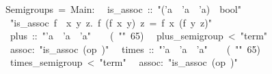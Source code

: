 \begin{isabelle}%
~Semigroups~=~Main:\isanewline
\isanewline
{}\isanewline
~~is\_assoc~::~{"}('a~{\isasymRightarrow}~'a~{\isasymRightarrow}~'a)~{\isasymRightarrow}~bool{"}\isanewline
~~{"}is\_assoc~f~{\isasymequiv}~{\isasymforall}x~y~z.~f~(f~x~y)~z~=~f~x~(f~y~z){"}\isanewline
\isanewline
{}\isanewline
~~plus~::~{"}'a~{\isasymRightarrow}~'a~{\isasymRightarrow}~'a{"}~~~~(~{"}{\isasymOplus}{"}~65)\isanewline
{}\isanewline
~~plus\_semigroup~<~{"}term{"}\isanewline
~~assoc:~{"}is\_assoc~(op~{\isasymOplus}){"}\isanewline
\isanewline
{}\isanewline
~~times~::~{"}'a~{\isasymRightarrow}~'a~{\isasymRightarrow}~'a{"}~~~~(~{"}{\isasymOtimes}{"}~65)\isanewline
{}\isanewline
~~times\_semigroup~<~{"}term{"}\isanewline
~~assoc:~{"}is\_assoc~(op~{\isasymOtimes}){"}\isanewline
\isanewline
{}\end{isabelle}%
